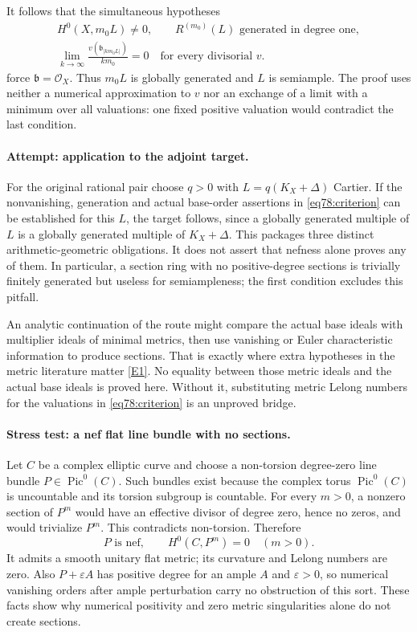 \documentclass[11pt,a4paper]{article}
\numberwithin{equation}{section}
\newcommand{\eref}[2]{\hyperlink{extra:#1:#2}{[E#2]}}
\begin{document}
It follows that the simultaneous hypotheses
\begin{equation}\label{eq78:criterion}
 \begin{gathered}
 H^0(X,m_0L)\ne0,\qquad R^{(m_0)}(L)\text{ generated in degree one},\\
 \lim_{k\to\infty}\frac{v(\mathfrak b_{|km_0L|})}{km_0}=0
       \quad\text{for every divisorial }v.
 \end{gathered}
\end{equation}
force $\mathfrak b=\mathcal O_X$. Thus $m_0L$ is globally generated and
$L$ is semiample. The proof uses neither a numerical approximation to
$v$ nor an exchange of a limit with a minimum over all valuations: one
fixed positive valuation would contradict the last condition.

\paragraph{Attempt: application to the adjoint target.}
For the original rational pair choose $q>0$ with
$L=q(K_X+\Delta)$ Cartier. If the nonvanishing, generation and actual
base-order assertions in \eqref{eq78:criterion} can be established for
this $L$, the target follows, since a globally generated multiple of $L$
is a globally generated multiple of $K_X+\Delta$.
This packages three distinct arithmetic-geometric obligations. It does
not assert that nefness alone proves any of them. In particular, a section
ring with no positive-degree sections is trivially finitely generated but
useless for semiampleness; the first condition excludes this pitfall.

An analytic continuation of the route might compare the actual base ideals
with multiplier ideals of minimal metrics, then use vanishing or Euler
characteristic information to produce sections. That is exactly where
extra hypotheses in the metric literature matter \eref{30006714}{1}.
No equality between those metric ideals and the actual base ideals is
proved here. Without it, substituting metric Lelong numbers for the
valuations in \eqref{eq78:criterion} is an unproved bridge.

\paragraph{Stress test: a nef flat line bundle with no sections.}
Let $C$ be a complex elliptic curve and choose a non-torsion degree-zero
line bundle $P\in\operatorname{Pic}^0(C)$. Such bundles exist because the
complex torus $\operatorname{Pic}^0(C)$ is uncountable and its torsion
subgroup is countable. For every $m>0$, a nonzero section of $P^m$ would
have an effective divisor of degree zero, hence no zeros, and would
trivialize $P^m$. This contradicts non-torsion. Therefore
\[
 P\text{ is nef},\qquad H^0(C,P^m)=0\quad(m>0).
\]
It admits a smooth unitary flat metric; its curvature and Lelong numbers
are zero. Also $P+\varepsilon A$ has positive degree for an ample $A$
and $\varepsilon>0$, so numerical vanishing orders after ample perturbation
carry no obstruction of this sort. These facts show why numerical
positivity and zero metric singularities alone do not create sections.
\end{document}
